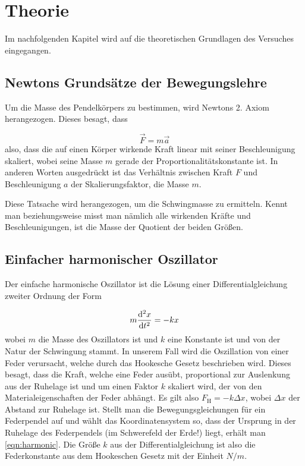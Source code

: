 \chapter{Theorie}
\label{sec:theorie}

Im nachfolgenden Kapitel wird auf die theoretischen Grundlagen des Versuches eingegangen.

\section{Newtons Grundsätze der Bewegungslehre}
Um die Masse des Pendelkörpers zu bestimmen, wird Newtons 2. Axiom herangezogen. \cite{newton} Dieses besagt, dass

\begin{equation}\label{eqn:newt}
	\vec{F} = m\vec{a}
\end{equation}
also, dass die auf einen Körper wirkende Kraft linear mit seiner Beschleunigung skaliert, wobei seine Masse \( m \) gerade der Proportionalitätskonstante ist. In anderen Worten ausgedrückt ist das Verhältnis zwischen Kraft \( F \) und Beschleunigung \( a \) der Skalierungsfaktor, die Masse \( m \). 

Diese Tatsache wird herangezogen, um die Schwingmasse zu ermitteln. Kennt man beziehungsweise misst man nämlich alle wirkenden Kräfte und Beschleunigungen, ist die Masse der Quotient der beiden Größen. 

\section{Einfacher harmonischer Oszillator}
Der einfache harmonische Oszillator ist die Lösung einer Differentialgleichung zweiter Ordnung der Form

\begin{equation}\label{eqn:harmonic}
	m\dv[2]{x}{t} = -kx
\end{equation}
wobei \( m \) die Masse des Oszillators ist und \( k \) eine Konstante ist und von der Natur der Schwingung stammt. In unserem Fall wird die Oszillation von einer Feder verursacht, welche durch das Hookesche Gesetz beschrieben wird. Dieses besagt, dass die Kraft, welche eine Feder ausübt, proportional zur Auslenkung aus der Ruhelage ist und um einen Faktor \( k \) skaliert wird, der von den Materialeigenschaften der Feder abhängt. Es gilt also \( F_{\text{H}} = -k\Delta x\), wobei \( \Delta x \) der Abstand zur Ruhelage ist.
Stellt man die Bewegungsgleichungen für ein Federpendel auf und wählt das Koordinatensystem so, dass der Ursprung in der Ruhelage des Federpendels (im Schwerefeld der Erde!) liegt, erhält man \autoref{eqn:harmonic}. Die Größe \( k \) aus der Differentialgleichung ist also die Federkonstante aus dem Hookeschen Gesetz mit der Einheit \( \unit{N/m} \).

